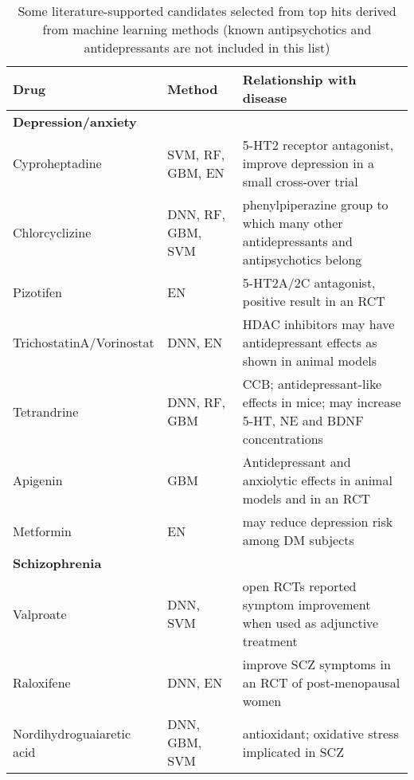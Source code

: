     \begin{sidewaystable}
      \caption{Some literature-supported candidates selected from top hits derived from machine learning methods (known antipsychotics and antidepressants are not included in this list)}
      \begin{threeparttable}
      \centering
      \begin{tabular}{lll}
        \toprule
        Drug  & Method & Relationship with disease \\
        \midrule
        \textbf{Depression/anxiety} &       &  \\
        Cyproheptadine & \multicolumn{1}{p{5.5em}}{SVM, RF, \newline{}GBM, EN} & 5-HT2 receptor antagonist, improve depression in a small cross-over trial \\
        Chlorcyclizine & \multicolumn{1}{p{5.5em}}{DNN, RF, \newline{}GBM, SVM} & \multicolumn{1}{p{32.915em}}{phenylpiperazine group to which many other antidepressants \newline{}and antipsychotics belong} \\
        Pizotifen  & EN    & 5-HT2A/2C antagonist, positive result in an RCT \\
        \multicolumn{1}{p{8.585em}}{TrichostatinA/\newline{}Vorinostat } & DNN, EN & HDAC inhibitors may have antidepressant effects as shown in animal models \\
        Tetrandrine & \multicolumn{1}{p{5.5em}}{DNN, RF, \newline{}GBM} & \multicolumn{1}{p{32.915em}}{CCB; antidepressant-like effects in mice; may increase 5-HT, NE \newline{}and BDNF concentrations} \\
        Apigenin & GBM   & Antidepressant and anxiolytic effects in animal models and in an RCT \\
        Metformin & EN    & may reduce depression risk among DM subjects  \\
        \textbf{Schizophrenia} &       &  \\
        Valproate  & DNN, SVM & open RCTs reported symptom improvement when used as adjunctive treatment \\
        Raloxifene & DNN, EN & improve SCZ symptoms in an RCT of post-menopausal women \\
        \multicolumn{1}{p{8.585em}}{Nordihydroguaiaretic \newline{}acid } & \multicolumn{1}{p{5.5em}}{DNN, GBM, \newline{}SVM} & antioxidant; oxidative stress implicated in SCZ \\

\end{tabular}
\end{threeparttable}
\end{sidewaystable}
